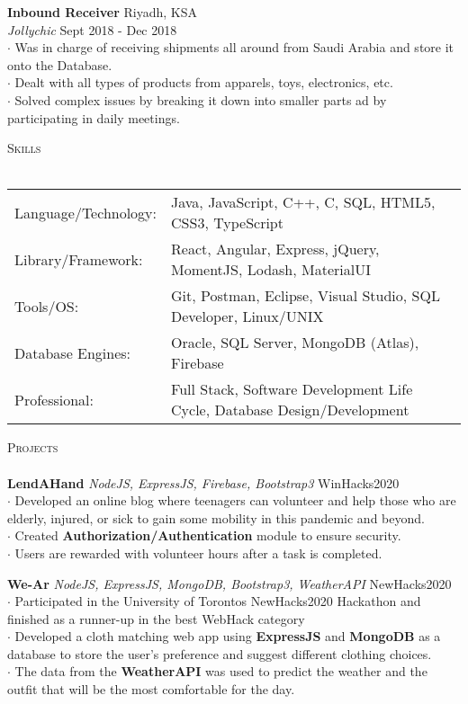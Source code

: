 \documentclass[a4paper]{article}
\newcommand{\lineunder} {
    \vspace*{-8pt} \\
    \hspace*{-18pt} \hrulefill \\
}
\newcommand{\header} [1] {
    {\hspace*{-18pt}\vspace*{6pt} \textsc{#1}}
    \vspace*{-6pt} \lineunder
}
\begin{document}
\textbf{Inbound Receiver} \hfill Riyadh, KSA\\
\textit{Jollychic} \hfill Sept 2018 - Dec 2018\\\vspace*{0.5mm}
$\cdot$ Was in charge of receiving shipments all around from Saudi Arabia and store it onto the Database.\\
$\cdot$ Dealt with all types of products from apparels, toys, electronics, etc.\\
$\cdot$ Solved complex issues by breaking it down into smaller parts ad by participating in daily meetings.
\vspace*{2mm}


{\large\header{Skills}}\vspace{1mm}
\begin{tabular}{ l l  }
	Language/Technology: & Java, JavaScript, C++, C, SQL, HTML5, CSS3, TypeScript  \\
	Library/Framework:   & React, Angular, Express, jQuery, MomentJS, Lodash, MaterialUI \\
	Tools/OS:               & Git, Postman, Eclipse, Visual Studio, SQL Developer, Linux/UNIX  \\
	Database Engines:      & Oracle, SQL Server, MongoDB (Atlas), Firebase                            \\
	Professional:      & Full Stack, Software Development Life Cycle, Database Design/Development 
                            \\
\end{tabular}
\vspace{0.3mm}

{\large\header{Projects}}\vspace{0.3mm}
{\textbf{LendAHand}} {\sl NodeJS, ExpressJS, Firebase, Bootstrap3} \hfill WinHacks2020\\
$\cdot$ Developed an online blog where teenagers can volunteer and help those who are elderly, injured, or sick to gain some mobility in this pandemic and beyond.\\
$\cdot$ Created {\textbf{Authorization/Authentication}} module to ensure security.\\
$\cdot$ Users are rewarded with volunteer hours after a task is completed.\\
\vspace*{2mm}

{\textbf{We-Ar}} {\sl NodeJS, ExpressJS, MongoDB, Bootstrap3, WeatherAPI} \hfill NewHacks2020\\
$\cdot$ Participated in the University of Torontos NewHacks2020 Hackathon and finished as a runner-up in
the best WebHack category\\
$\cdot$ Developed a cloth matching web app using {\textbf{ExpressJS}} and {\textbf{MongoDB}} as a database to store the user's preference and suggest different clothing choices.\\
$\cdot$ The data from the {\textbf{WeatherAPI}} was used to predict the weather and the outfit that will be the most comfortable for the day.\\
\end{document}
